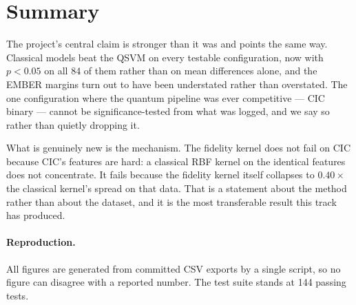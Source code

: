 \documentclass[11pt]{article}
\begin{document}
\section{Summary}

The project's central claim is stronger than it was and points the same way.
Classical models beat the QSVM on every testable configuration, now with
$p < 0.05$ on all 84 of them rather than on mean differences alone, and the
EMBER margins turn out to have been understated rather than overstated. The one
configuration where the quantum pipeline was ever competitive --- CIC binary ---
cannot be significance-tested from what was logged, and we say so rather than
quietly dropping it.

What is genuinely new is the mechanism. The fidelity kernel does not fail on CIC
because CIC's features are hard: a classical RBF kernel on the identical
features does not concentrate. It fails because the fidelity kernel itself
collapses to $0.40\times$ the classical kernel's spread on that data. That is a
statement about the method rather than about the dataset, and it is the most
transferable result this track has produced.

\paragraph{Reproduction.}
All figures are generated from committed CSV exports by a single script, so no
figure can disagree with a reported number. The test suite stands at 144 passing
tests.
\end{document}
